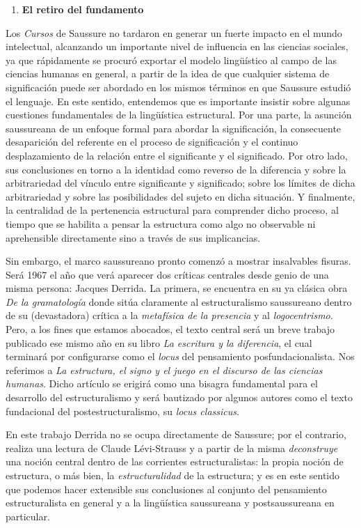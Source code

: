 \begin{enumerate}
\def\labelenumi{\arabic{enumi}.}
\item
  \textbf{El retiro del fundamento}
\end{enumerate}

Los \emph{Cursos} de Saussure no tardaron en generar un fuerte impacto en el mundo intelectual, alcanzando un importante nivel de influencia en las ciencias sociales, ya que rápidamente se procuró exportar el modelo lingüístico al campo de las ciencias humanas en general, a partir de la idea de que cualquier sistema de significación puede ser abordado en los mismos términos en que Saussure estudió el lenguaje. En este sentido, entendemos que es importante insistir sobre algunas cuestiones fundamentales de la lingüística estructural. Por una parte, la asunción saussureana de un enfoque formal para abordar la significación, la consecuente desaparición del referente en el proceso de significación y el continuo desplazamiento de la relación entre el significante y el significado. Por otro lado, sus conclusiones en torno a la identidad como reverso de la diferencia y sobre la arbitrariedad del vínculo entre significante y significado; sobre los límites de dicha arbitrariedad y sobre las posibilidades del sujeto en dicha situación. Y finalmente, la centralidad de la pertenencia estructural para comprender dicho proceso, al tiempo que se habilita a pensar la estructura como algo no observable ni aprehensible directamente sino a través de sus implicancias.

Sin embargo, el marco saussureano pronto comenzó a mostrar insalvables fisuras. Será 1967 el año que verá aparecer dos críticas centrales desde genio de una misma persona: Jacques Derrida. La primera, se encuentra en su ya clásica obra \emph{De la gramatología} donde sitúa claramente al estructuralismo saussureano dentro de su (devastadora) crítica a la \emph{metafísica de la presencia} y al \emph{logocentrismo}. Pero, a los fines que estamos abocados, el texto central será un breve trabajo publicado ese mismo año en su libro \emph{La escritura y la diferencia}, el cual terminará por configurarse como el \emph{locus} del pensamiento posfundacionalista. Nos referimos a \emph{La estructura, el signo y el juego en el discurso de las ciencias humanas}. Dicho artículo se erigirá como una bisagra fundamental para el desarrollo del estructuralismo y será bautizado por algunos autores como el texto fundacional del postestructuralismo, su \emph{locus classicus}.

En este trabajo Derrida no se ocupa directamente de Saussure; por el contrario, realiza una lectura de Claude Lévi-Strauss y a partir de la misma \emph{deconstruye} una noción central dentro de las corrientes estructuralistas: la propia noción de estructura, o más bien, la \emph{estructuralidad} de la estructura; y es en este sentido que podemos hacer extensible sus conclusiones al conjunto del pensamiento estructuralista en general y a la lingüística saussureana y postsaussureana en particular.

